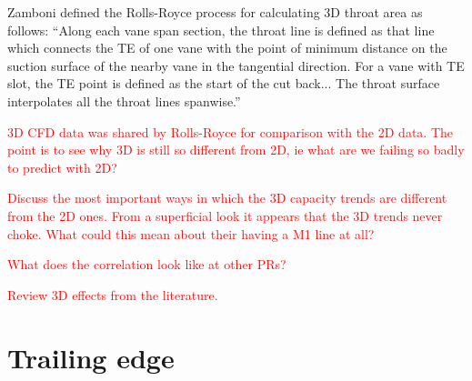 \documentclass[a4paper, 11pt, twoside]{report}
\begin{document}
Zamboni defined the Rolls-Royce process for calculating 3D throat area as follows: ``Along each vane span section, the throat line is defined as that line which connects the TE of one vane with the point of minimum distance on the suction surface of the nearby vane in the tangential direction. For a vane with TE slot, the TE point is defined as the start of the cut back... The throat surface interpolates all the throat lines spanwise.''

\textcolor{red}{3D CFD data was shared by Rolls-Royce for comparison with the 2D data. The point is to see why 3D is still so different from 2D, ie what are we failing so badly to predict with 2D?}

\textcolor{red}{Discuss the most important ways in which the 3D capacity trends are different from the 2D ones. From a superficial look it appears that the 3D trends never choke. What could this mean about their having a M1 line at all?}

\textcolor{red}{What does the correlation look like at other PRs?}

\textcolor{red}{Review 3D effects from the literature.}



\chapter{Trailing edge}
\label{chapter_trailing_edge}


\end{document}
